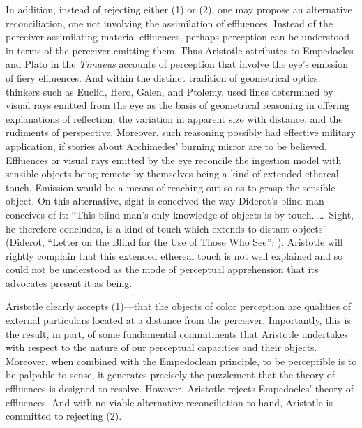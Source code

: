 In addition, instead of rejecting either (1) or (2), one may propose an alternative reconciliation, one not involving the assimilation of effluences. Instead of the perceiver assimilating material effluences, perhaps perception can be understood in terms of the perceiver emitting them. Thus Aristotle attributes to Empedocles and Plato in the \emph{Timaeus} accounts of perception that involve the eye's emission of fiery effluences. And within the distinct tradition of geometrical optics, thinkers such as Euclid, Hero, Galen, and Ptolemy, used lines determined by visual rays emitted from the eye as the basis of geometrical reasoning in offering explanations of reflection, the variation in apparent size with distance, and the rudiments of perspective. Moreover, such reasoning possibly had effective military application, if stories about Archimedes' burning mirror are to be believed. Effluences or visual rays emitted by the eye reconcile the ingestion model with sensible objects being remote by themselves being a kind of extended ethereal touch. Emission would be a means of reaching out so as to grasp the sensible object. On this alternative, sight is conceived the way Diderot's blind man conceives of it: ``This blind man's only knowledge of objects is by touch. \ldots\ Sight, he therefore concludes, is a kind of touch which extends to distant objects'' (Diderot, ``Letter on the Blind for the Use of Those Who See''; \citealt[72]{Jourdain:1916aa}). Aristotle will rightly complain that this extended ethereal touch is not well explained and so could not be understood as the mode of perceptual apprehension that its advocates present it as being.

Aristotle clearly accepts (1)---that the objects of color perception are qualities of external particulars located at a distance from the perceiver. Importantly, this is the result, in part, of some fundamental commitments that Aristotle undertakes with respect to the nature of our perceptual capacities and their objects. Moreover, when combined with the Empedoclean principle, to be perceptible is to be palpable to sense, it generates precisely the puzzlement that the theory of effluences is designed to resolve. However, Aristotle rejects Empedocles' theory of effluences. And with no viable alternative reconciliation to hand, Aristotle is committed to rejecting (2). 

